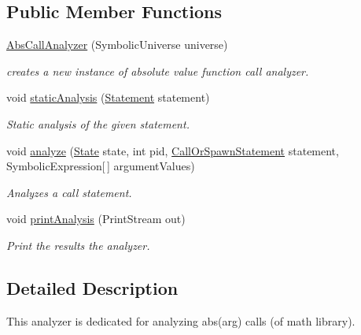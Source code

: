 \subsection*{Public Member Functions}
\begin{DoxyCompactItemize}
\item 
\hyperlink{classedu_1_1udel_1_1cis_1_1vsl_1_1civl_1_1analysis_1_1common_1_1AbsCallAnalyzer_adfc5a21f871babc86462b41b6321fd1c}{Abs\+Call\+Analyzer} (Symbolic\+Universe universe)
\begin{DoxyCompactList}\small\item\em creates a new instance of absolute value function call analyzer. \end{DoxyCompactList}\item 
void \hyperlink{classedu_1_1udel_1_1cis_1_1vsl_1_1civl_1_1analysis_1_1common_1_1AbsCallAnalyzer_a3cc0e3f03de95e9b88f0cd03213bc03d}{static\+Analysis} (\hyperlink{interfaceedu_1_1udel_1_1cis_1_1vsl_1_1civl_1_1model_1_1IF_1_1statement_1_1Statement}{Statement} statement)
\begin{DoxyCompactList}\small\item\em Static analysis of the given statement. \end{DoxyCompactList}\item 
void \hyperlink{classedu_1_1udel_1_1cis_1_1vsl_1_1civl_1_1analysis_1_1common_1_1AbsCallAnalyzer_a149a736d2a07556f6086a5891269410e}{analyze} (\hyperlink{interfaceedu_1_1udel_1_1cis_1_1vsl_1_1civl_1_1state_1_1IF_1_1State}{State} state, int pid, \hyperlink{interfaceedu_1_1udel_1_1cis_1_1vsl_1_1civl_1_1model_1_1IF_1_1statement_1_1CallOrSpawnStatement}{Call\+Or\+Spawn\+Statement} statement, Symbolic\+Expression\mbox{[}$\,$\mbox{]} argument\+Values)
\begin{DoxyCompactList}\small\item\em Analyzes a call statement. \end{DoxyCompactList}\item 
void \hyperlink{classedu_1_1udel_1_1cis_1_1vsl_1_1civl_1_1analysis_1_1common_1_1AbsCallAnalyzer_ad1858fef1ac0948b1eaf4a7d3873450b}{print\+Analysis} (Print\+Stream out)
\begin{DoxyCompactList}\small\item\em Print the results the analyzer. \end{DoxyCompactList}\end{DoxyCompactItemize}


\subsection{Detailed Description}
This analyzer is dedicated for analyzing abs(arg) calls (of math library). 

